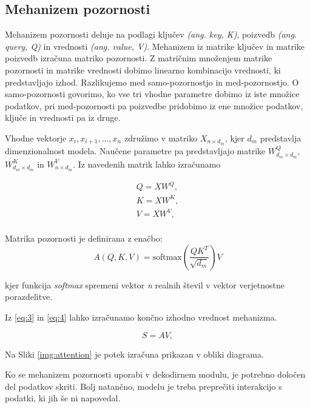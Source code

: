 \documentclass[a4paper,12pt,openright]{book}
\begin{document}
\subsection{Mehanizem pozornosti}
Mehanizem pozornosti deluje na podlagi ključev \emph{(ang. key, K)}, poizvedb \emph{(ang. query, Q)} in vrednosti \emph{(ang. value, V)}. Mehanizem iz matrike ključev in matrike poizvedb izračuna matriko pozornosti. Z matričnim množenjem matrike pozornosti in matrike vrednosti dobimo linearno kombinacijo vrednosti, ki predstavljajo izhod. Razlikujemo med samo-pozornostjo in med-pozornostjo. O samo-pozornosti govorimo, ko vse tri vhodne parametre dobimo iz iste množice podatkov, pri med-pozornosti pa poizvedbe pridobimo iz ene množice podatkov, ključe in vrednosti pa iz druge.

Vhodne vektorje $ x_i, x_{i+1},..., x_{n} $ združimo v matriko $ X_{n \times d_m} $, kjer $ d_m $ predstavlja dimenzionalnost modela. Naučene parametre pa predstavljajo matrike $ W^Q_{d_m \times d_m} $, $ W^K_{d_m \times d_m} $ in $ W^V_{n \times d_m} $. Iz navedenih matrik lahko izračunamo

\begin{equation}
    \begin{split}
        Q = XW^Q, \\
        K = XW^K, \\
        V = XW^V, \\
    \end{split}
    \label{eq:3}
\end{equation}

Matrika pozornosti je definirana z enačbo:
\begin{equation}
    A(Q, K, V) = \text{softmax}(\frac{QK^T}{\sqrt{d_m}})V
    \label{eq:4}
\end{equation}

kjer funkcija \emph{softmax} spremeni vektor \emph{n} realnih števil v vektor verjetnostne porazdelitve.

Iz \ref{eq:3} in \ref{eq:4} lahko izračunamo končno izhodno vrednost mehanizma.

\begin{equation}
    S = AV,
    \label{eq:5}
\end{equation}

Na Sliki \ref{img:attention} je potek izračuna prikazan v obliki diagrama.


Ko se mehanizem pozornosti uporabi v dekodirnem modulu, je potrebno določen del podatkov skriti. Bolj natančno, modelu je treba preprečiti interakcijo s podatki, ki jih še ni napovedal.
\end{document}
